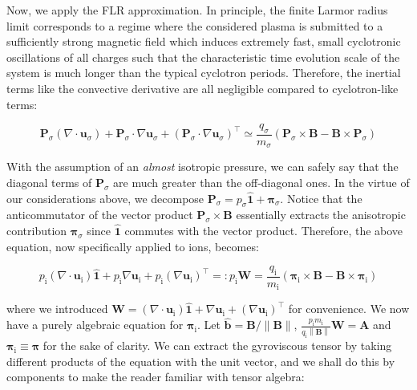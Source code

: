Now, we apply the FLR approximation. In principle, the finite Larmor radius limit corresponds to a regime where the considered plasma is submitted to a sufficiently strong magnetic field which induces extremely fast, small cyclotronic oscillations of all charges such that the characteristic time evolution scale of the system is much longer than the typical cyclotron periods. Therefore, the inertial terms like the convective derivative are all negligible compared to cyclotron-like terms:

\begin{equation*}
    \mathbf{P}_\sigma \left(\nabla\cdot{\mathbf{u}_\sigma}\right)+\mathbf{P}_\sigma\cdot\nabla \mathbf{u}_\sigma+\left(\mathbf{P}_\sigma \cdot\nabla \mathbf{u}_\sigma\right)^\top\simeq\frac{q_\sigma}{m_\sigma}\left(\mathbf{P}_\sigma\times \mathbf{B}-\mathbf{B}\times \mathbf{P}_{\sigma}\right)
\end{equation*}

With the assumption of an \textit{almost} isotropic pressure, we can safely say that the diagonal terms of $\mathbf{P}_\sigma$ are much greater than the off-diagonal ones. In the virtue of our considerations above, we decompose $\mathbf{P}_\sigma=p_\sigma \mathbf{\hat{1}}+\boldsymbol{\pi}_\sigma$. Notice that the anticommutator of the vector product $\mathbf{P}_\sigma\times\mathbf{B}$ essentially extracts the anisotropic contribution $\boldsymbol{\pi}_\sigma$ since $\mathbf{\hat{1}}$ commutes with the vector product. Therefore, the above equation, now specifically applied to ions, becomes:

\begin{equation}
    \label{comp-31}
    p_{\mathrm{i}}\left(\nabla\cdot{\mathbf{u}_{\mathrm{i}}}\right)\mathbf{\hat{1}}+p_{\mathrm{i}}\nabla \mathbf{u}_{\mathrm{i}}+p_{\mathrm{i}}\left(\nabla \mathbf{u}_{\mathrm{i}}\right)^\top=:p_{\mathrm{i}}\mathbf{W}=\frac{q_{\mathrm{i}}}{m_{\mathrm{i}}}\left(\boldsymbol{\pi}_{\mathrm{i}}\times \mathbf{B}-\mathbf{B}\times\boldsymbol{\pi}_{\mathrm{i}}\right)
\end{equation}

where we introduced $\mathbf{W}=\left(\nabla\cdot{\mathbf{u}_{\mathrm{i}}}\right)\mathbf{\hat{1}}+\nabla \mathbf{u}_{\mathrm{i}}+\left(\nabla \mathbf{u}_{\mathrm{i}}\right)^\top$ for convenience. We now have a purely algebraic equation for $\boldsymbol{\pi}_{\mathrm{i}}$. Let $\mathbf{\hat{b}}=\mathbf{B}/\|\mathbf{B}\|$, $\frac{p_{\mathrm{i}}m_{\mathrm{i}}}{q_{\mathrm{i}}\left\|\mathbf{B}\right\|}\mathbf{W}=\mathbf{A}$ and $\boldsymbol{\pi}_{\mathrm{i}}\equiv\boldsymbol{\pi}$ for the sake of clarity. We can extract the gyroviscous tensor by taking different products of the equation with the unit vector, and we shall do this by components to make the reader familiar with tensor algebra: 

